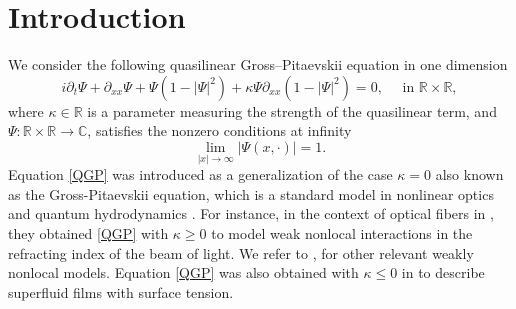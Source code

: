 \documentclass[11pt]{article}
\newcommand{\C}{\mathbb{C}}
\newcommand{\R}{\mathbb{R}}
\providecommand{\abs}[1]{|#1 |}
\theoremstyle{plain}
\theoremstyle{definition}
\theoremstyle{remark}
\numberwithin{equation}{section}
\begin{document}
{	%
	\section{Introduction}
	We consider the following quasilinear Gross--Pitaevskii equation in one dimension
	\begin{equation}	\label{QGP}
		i\partial_t\Psi+\partial_{xx}\Psi+\Psi(1-|\Psi|^2)+\kappa\Psi\partial_{xx}(1-|\Psi|^2)=0,\quad\text{ in }\R\times\R,
	\end{equation}
	where $\kappa\in\R$ is a parameter measuring the strength of the quasilinear term, and $\Psi:\R\times\R\to\C$, satisfies the nonzero conditions at infinity
	\begin{equation}
		\label{nonzero0}
		\lim_{|x|\to \infty}| \Psi(x,\cdot)|=1.
	\end{equation} 
	Equation \eqref{QGP} was introduced as a generalization of the case $\kappa=0$ also known as the Gross-Pitaevskii equation, which is a standard model in nonlinear optics and quantum hydrodynamics \cite{kivshar,fibich,kevFrCa0}. For instance, in the context of optical fibers in \cite{krolikowski2000}, they obtained \eqref{QGP} with $\kappa\geq0$  to model weak nonlocal interactions in the refracting index of the beam of light. We refer to \cite{HorikisWnonloc}, for other relevant weakly nonlocal models. Equation \eqref{QGP} was also obtained with $\kappa\leq0$ in \cite{kurihara} to describe superfluid films with surface tension.
	
}
\end{document}

